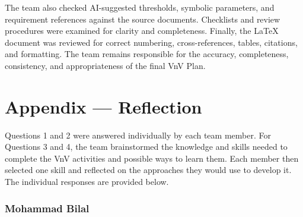 \documentclass[10pt,titlepage]{article}
\begin{document}
The team also checked AI-suggested thresholds, symbolic parameters, and
requirement references against the source documents. Checklists and review
procedures were examined for clarity and completeness. Finally, the \LaTeX{}
document was reviewed for correct numbering, cross-references, tables,
citations, and formatting. The team remains responsible for the accuracy,
completeness, consistency, and appropriateness of the final VnV Plan.

\newpage{}

\section{Appendix --- Reflection}\label{sec:Reflection}

Questions 1 and 2 were answered individually by each team member. For
Questions 3 and 4, the team brainstormed the knowledge and skills needed to
complete the VnV activities and possible ways to learn them. Each member then
selected one skill and reflected on the approaches they would use to develop it.
The individual responses are provided below.

\subsubsection*{Mohammad Bilal}
\end{document}
